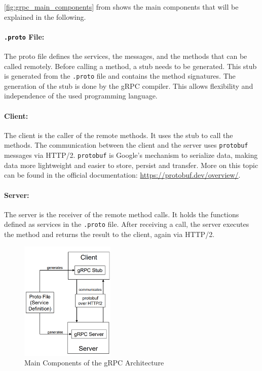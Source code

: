 \autoref{fig:grpc_main_components} from \cite{CM-T-DES} shows the main components that will be explained in the following.

\paragraph*{\texttt{.proto} File:}
The proto file defines the services, the messages, and the methods that can be called remotely.
Before calling a method, a stub needs to be generated.
This stub is generated from the \texttt{.proto} file and contains the method signatures.
The generation of the stub is done by the gRPC compiler.
This allows flexibility and independence of the used programming language.

\paragraph*{Client:}
The client is the caller of the remote methods.
It uses the stub to call the methods.
The communication between the client and the server uses \texttt{protobuf} messages via HTTP/2.
\texttt{protobuf} is Google's mechanism to serialize data, making data more lightweight and easier to store, persist and transfer.
More on this topic can be found in the official documentation: \url{https://protobuf.dev/overview/}.

\paragraph*{Server:}
The server is the receiver of the remote method calls.
It holds the functions defined as services in the \texttt{.proto} file.
After receiving a call, the server executes the method and returns the result to the client, again via HTTP/2.

\begin{figure}
    \centering
    \includegraphics[width=0.4\textwidth]{figures/microservices/microservices_grpcMainComponents.png}
    \caption{Main Components of the gRPC Architecture}
    \label{fig:grpc_main_components}
\end{figure}

